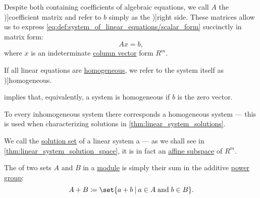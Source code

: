 \begin{definition}
  Despite both containing coefficients of algebraic equations, we call \( A \) the \term[ru=матрица коеффициентов (\cite[\S 3.1]{Тыртышников2007ЛинейнаяАлгебра})]{coefficient matrix} and refer to \( b \) simply as the \term[ru=правая часть (\cite[\S 3.1]{Тыртышников2007ЛинейнаяАлгебра})]{right side}. These matrices allow us to express \eqref{eq:def:system_of_linear_equations/scalar_form} succinctly in matrix form:
  \begin{equation}\label{eq:def:system_of_linear_equations/matrix_form}
    Ax = b,
  \end{equation}
  where \( x \) is an indeterminate \hyperref[def:array/column_vector]{column vector} form \( R^m \).

  \begin{thmenum}
     If all linear equations are \hyperref[def:homogeneous_equation]{homogeneous}, we refer to the system itself as \term[ru=однородная (система алгебраических уравнений) (\cite[\S 7.7]{Тыртышников2007ЛинейнаяАлгебра})]{homogeneous}.

     implies that, equivalently, a system is homogeneous if \( b \) is the zero vector.

    To every inhomogeneous system there corresponds a homogeneous system --- this is used when characterizing solutions in \cref{thm:linear_system_solutions}.

     We call the \hyperref[def:equation/solution]{solution set} of a linear system a  --- as we shall see in \cref{thm:linear_system_solution_space}, it is in fact an \hyperref[def:affine_subspace]{affine subspace} of \( R^m \).
  \end{thmenum}
\end{definition}

\begin{definition}\label{def:minkowski_sum}
  The  of two sets \( A \) and \( B \) in a \hyperref[def:module]{module} is simply their sum in the additive \hyperref[def:power_semigroup]{power group}:
  \begin{equation}\label{eq:def:minkowski_sum}
    A + B \coloneqq \set{ a + b \given a \in A \T{and} b \in B }.
  \end{equation}
\end{definition}

